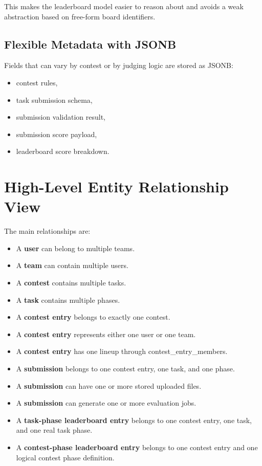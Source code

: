 \documentclass[11pt,a4paper]{article}
\begin{document}
This makes the leaderboard model easier to reason about and avoids a weak abstraction based on free-form board identifiers.

\subsection{Flexible Metadata with JSONB}
Fields that can vary by contest or by judging logic are stored as JSONB:
\begin{itemize}
    \item contest rules,
    \item task submission schema,
    \item submission validation result,
    \item submission score payload,
    \item leaderboard score breakdown.
\end{itemize}

\section{High-Level Entity Relationship View}
The main relationships are:

\begin{itemize}
    \item A \textbf{user} can belong to multiple teams.
    \item A \textbf{team} can contain multiple users.
    \item A \textbf{contest} contains multiple tasks.
    \item A \textbf{task} contains multiple phases.
    \item A \textbf{contest entry} belongs to exactly one contest.
    \item A \textbf{contest entry} represents either one user or one team.
    \item A \textbf{contest entry} has one lineup through contest\_entry\_members.
    \item A \textbf{submission} belongs to one contest entry, one task, and one phase.
    \item A \textbf{submission} can have one or more stored uploaded files.
    \item A \textbf{submission} can generate one or more evaluation jobs.
    \item A \textbf{task-phase leaderboard entry} belongs to one contest entry, one task, and one real task phase.
    \item A \textbf{contest-phase leaderboard entry} belongs to one contest entry and one logical contest phase definition.
\end{itemize}
\end{document}

